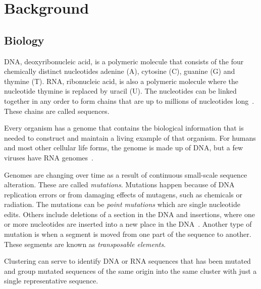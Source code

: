\section{Background}

\subsection{Biology}
\label{sec:biology}

DNA, deoxyribonucleic acid, is a polymeric molecule that consists of the four
chemically distinct nucleotides adenine (A), cytosine (C), guanine (G) and
thymine (T). RNA, ribonucleic acid, is also a polymeric molecule where the
nucleotide thymine is replaced by uracil (U).  The nucleotides can be linked
together in any order to form chains that are up to millions of nucleotides
long~\cite[pp.~8-9]{brown}. These chains are called sequences.

Every organism has a genome that contains the biological information that is
needed to construct and maintain a living example of that organism. For humans
and most other cellular life forms, the genome is made up of DNA, but a few
viruses have RNA genomes~\cite[pp. 3-4]{brown}.

Genomes are changing over time as a result of continuous small-scale sequence
alteration. These are called \textit{mutations}. Mutations happen because of
DNA replication errors or from damaging effects of mutagens, such as chemicals
or radiation. The mutations can be \textit{point mutations} which are single
nucleotide edits. Others include deletions of a section in the DNA and
insertions, where one or more nucleotides are inserted into a new place in the
DNA~\cite[pp. 505-506]{brown}. Another type of mutation is when a segment is moved from one part of the sequence to another. These segments are known as \emph{transposable elements}. %

Clustering can serve to identify DNA or RNA sequences that has been mutated and
group mutated sequences of the same origin into the same cluster with just a
single representative sequence.

